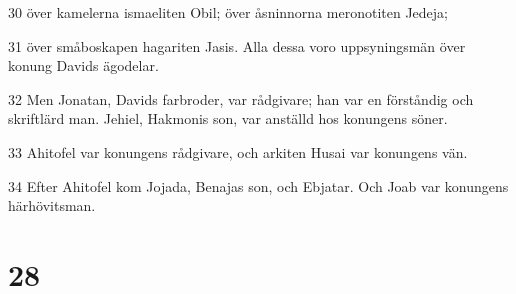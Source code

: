 \par 30 över kamelerna ismaeliten Obil; över åsninnorna meronotiten Jedeja;
\par 31 över småboskapen hagariten Jasis. Alla dessa voro uppsyningsmän över konung Davids ägodelar.
\par 32 Men Jonatan, Davids farbroder, var rådgivare; han var en förståndig och skriftlärd man. Jehiel, Hakmonis son, var anställd hos konungens söner.
\par 33 Ahitofel var konungens rådgivare, och arkiten Husai var konungens vän.
\par 34 Efter Ahitofel kom Jojada, Benajas son, och Ebjatar. Och Joab var konungens härhövitsman.

\chapter{28}

